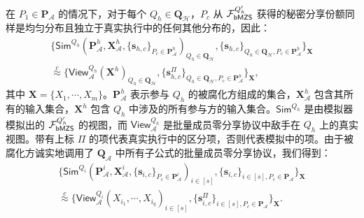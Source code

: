 \begin{trivlist}
在 $P_1 \in \textbf{P}_{\mathcal{A}}$ 的情况下，对于每个 $Q_h \in \textbf{Q}_{\mathcal{H}}$，$P_c$ 从 $\mathcal{F}_\mathsf{bMZS}^{Q'_h}$ 获得的秘密分享份额同样是均匀分布且独立于真实执行中的任何其他分布的，因此：
\begin{gather*}
\{\mathsf{Sim}^{Q_h}(\textbf{P}^h_{\mathcal{A}},\textbf{X}^h_{\mathcal{A}},\{\textbf{s}_{h, c}\}_{P_c \in \textbf{P}_{\mathcal{A}}^h})_{Q_h \in \textbf{Q}_{\mathcal{H}}}, \{\textbf{s}_{h, c}\}_{Q_h \in \textbf{Q}_{\mathcal{H}}, P_c \in \textbf{P}_{\mathcal{A}}^h}\}_\textbf{X} \\
\overset{c}{\approx} \{\mathsf{View}_{\mathcal{A}}^{Q_h}(\textbf{X}^h)_{Q_h \in \textbf{Q}_{\mathcal{H}}},\{\textbf{s}^{\Pi}_{h, c}\}_{Q_h \in \textbf{Q}_{\mathcal{H}},P_c \in \textbf{P}_{\mathcal{A}}^h}\}_\textbf{X},
\end{gather*}
其中 $\textbf{X} = \{X_1,\cdots,X_m\}$。$\textbf{P}_{\mathcal{A}}^h$ 表示参与 $Q_h$ 的被腐化方组成的集合，$\textbf{X}_{\mathcal{A}}^h$ 包含其所有的输入集合，$\textbf{X}^h$ 包含 $Q_h$ 中涉及的所有参与方的输入集合。$\mathsf{Sim}^{Q_h}$ 是由模拟器模拟出的 $\mathcal{F}_\mathsf{bMZS}^{Q'_h}$ 的视图，而 $\mathsf{View}_{\mathcal{A}}^{Q_h}$ 是批量成员零分享协议中敌手在 $Q_h$ 上的真实视图。带有上标 $\Pi$ 的项代表真实执行中的区分项，否则代表模拟中的项。由于被腐化方诚实地调用了 $\textbf{Q}_{\mathcal{A}}$ 中所有子公式的批量成员零分享协议，我们得到：
\begin{gather*}
\{\mathsf{Sim}^{Q_i}(\textbf{P}^i_{\mathcal{A}},\textbf{X}^i_{\mathcal{A}},\{\textbf{s}_{i, c}\}_{P_c \in \textbf{P}^i_{\mathcal{A}}})_{i \in [s]}, \{\textbf{s}_{i, c}\}_{i \in [s], P_c \in \textbf{P}_{\mathcal{A}}}\}_\textbf{X} \\
\overset{c}{\approx} \{\mathsf{View}_{\mathcal{A}}^{Q_i}(X_{i_1},\cdots,X_{i_q})_{i \in [s]},\{\textbf{s}^{\Pi}_{i, c}\}_{i \in [s], P_c \in \textbf{P}_{\mathcal{A}}}\}_\textbf{X}.
\end{gather*}


\end{trivlist}
